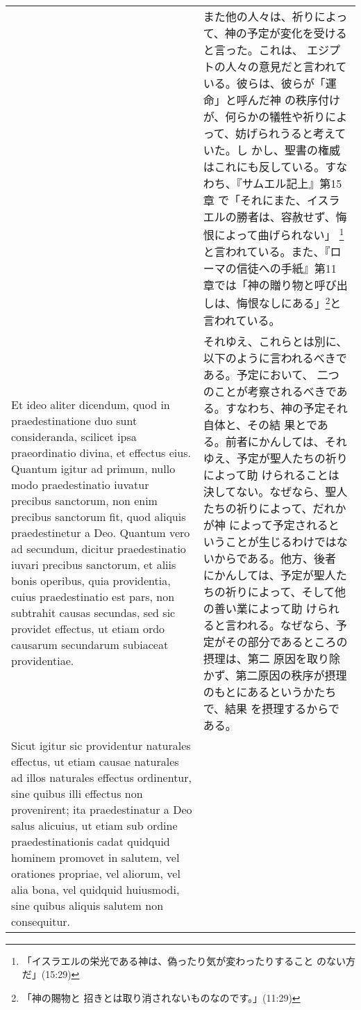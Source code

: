 \documentclass[10pt]{jsarticle} %
\begin{document}
\begin{longtable}{p{21em}p{21em}}
&

また他の人々は、祈りによって、神の予定が変化を受けると言った。これは、
エジプトの人々の意見だと言われている。彼らは、彼らが「運命」と呼んだ神
の秩序付けが、何らかの犠牲や祈りによって、妨げられうると考えていた。し
かし、聖書の権威はこれにも反している。すなわち、『サムエル記上』第15章
で「それにまた、イスラエルの勝者は、容赦せず、悔恨によって曲げられない」
\footnote{「イスラエルの栄光である神は、偽ったり気が変わったりすること
のない方だ」(15:29)}と言われている。また、『ローマの信徒への手紙』第11
章では「神の贈り物と呼び出しは、悔恨なしにある」\footnote{「神の賜物と
招きとは取り消されないものなのです。」(11:29)}と言われている。


\\


Et ideo
aliter dicendum, quod in praedestinatione duo sunt consideranda,
scilicet ipsa praeordinatio divina, et effectus eius. Quantum igitur ad
primum, nullo modo praedestinatio iuvatur precibus sanctorum, non enim
precibus sanctorum fit, quod aliquis praedestinetur a Deo. Quantum vero
ad secundum, dicitur praedestinatio iuvari precibus sanctorum, et aliis
bonis operibus, quia providentia, cuius praedestinatio est pars, non
subtrahit causas secundas, sed sic providet effectus, ut etiam ordo
causarum secundarum subiaceat providentiae. 


&

それゆえ、これらとは別に、以下のように言われるべきである。予定において、
二つのことが考察されるべきである。すなわち、神の予定それ自体と、その結
果とである。前者にかんしては、それゆえ、予定が聖人たちの祈りによって助
けられることは決してない。なぜなら、聖人たちの祈りによって、だれかが神
によって予定されるということが生じるわけではないからである。他方、後者
にかんしては、予定が聖人たちの祈りによって、そして他の善い業によって助
けられると言われる。なぜなら、予定がその部分であるところの摂理は、第二
原因を取り除かず、第二原因の秩序が摂理のもとにあるというかたちで、結果
を摂理するからである。


\\



Sicut igitur sic providentur
naturales effectus, ut etiam causae naturales ad illos naturales
effectus ordinentur, sine quibus illi effectus non provenirent; ita
praedestinatur a Deo salus alicuius, ut etiam sub ordine
praedestinationis cadat quidquid hominem promovet in salutem, vel
orationes propriae, vel aliorum, vel alia bona, vel quidquid huiusmodi,
sine quibus aliquis salutem non consequitur. 




\end{longtable}
\end{document}
